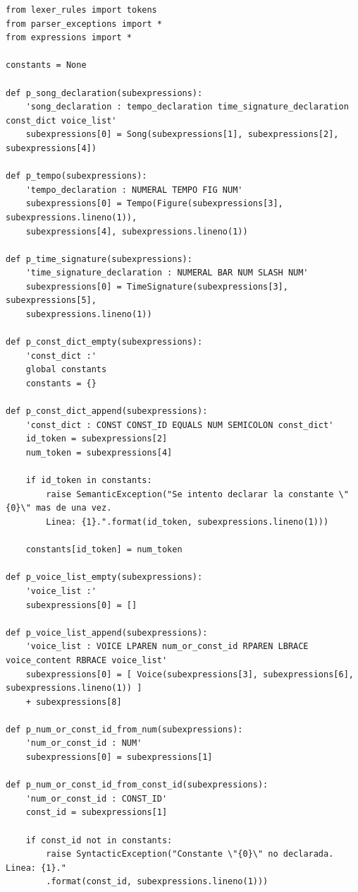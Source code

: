 \documentclass[a4paper, 10pt, twoside]{article}
\begin{document}
\begin{verbatim}
from lexer_rules import tokens
from parser_exceptions import *
from expressions import *

constants = None

def p_song_declaration(subexpressions):
    'song_declaration : tempo_declaration time_signature_declaration const_dict voice_list'
    subexpressions[0] = Song(subexpressions[1], subexpressions[2], subexpressions[4])

def p_tempo(subexpressions):
    'tempo_declaration : NUMERAL TEMPO FIG NUM'
    subexpressions[0] = Tempo(Figure(subexpressions[3], subexpressions.lineno(1)),
    subexpressions[4], subexpressions.lineno(1))

def p_time_signature(subexpressions):
    'time_signature_declaration : NUMERAL BAR NUM SLASH NUM'
    subexpressions[0] = TimeSignature(subexpressions[3], subexpressions[5], 
    subexpressions.lineno(1))    

def p_const_dict_empty(subexpressions):
    'const_dict :'
    global constants
    constants = {}

def p_const_dict_append(subexpressions):
    'const_dict : CONST CONST_ID EQUALS NUM SEMICOLON const_dict'
    id_token = subexpressions[2]
    num_token = subexpressions[4]
    
    if id_token in constants:        
        raise SemanticException("Se intento declarar la constante \"{0}\" mas de una vez. 
        Linea: {1}.".format(id_token, subexpressions.lineno(1)))
    
    constants[id_token] = num_token

def p_voice_list_empty(subexpressions):
    'voice_list :'
    subexpressions[0] = []

def p_voice_list_append(subexpressions):
    'voice_list : VOICE LPAREN num_or_const_id RPAREN LBRACE voice_content RBRACE voice_list'
    subexpressions[0] = [ Voice(subexpressions[3], subexpressions[6], subexpressions.lineno(1)) ]
    + subexpressions[8]

def p_num_or_const_id_from_num(subexpressions):
    'num_or_const_id : NUM'
    subexpressions[0] = subexpressions[1]

def p_num_or_const_id_from_const_id(subexpressions):
    'num_or_const_id : CONST_ID'
    const_id = subexpressions[1]

    if const_id not in constants:
        raise SyntacticException("Constante \"{0}\" no declarada. Linea: {1}."
        .format(const_id, subexpressions.lineno(1)))
            

\end{verbatim}
\end{document}
